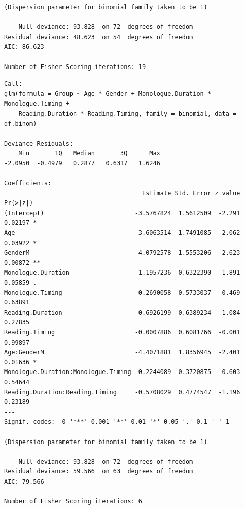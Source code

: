 \documentclass[
  english,
  doc,floatsintext]{apa6}
\begin{document}
\begin{verbatim}
(Dispersion parameter for binomial family taken to be 1)

    Null deviance: 93.828  on 72  degrees of freedom
Residual deviance: 48.623  on 54  degrees of freedom
AIC: 86.623

Number of Fisher Scoring iterations: 19
\end{verbatim}

\begin{verbatim}
Call:
glm(formula = Group ~ Age * Gender + Monologue.Duration * Monologue.Timing + 
    Reading.Duration * Reading.Timing, family = binomial, data = df.binom)

Deviance Residuals: 
    Min       1Q   Median       3Q      Max  
-2.0950  -0.4979   0.2877   0.6317   1.6246  

Coefficients:
                                      Estimate Std. Error z value Pr(>|z|)   
(Intercept)                         -3.5767824  1.5612509  -2.291  0.02197 * 
Age                                  3.6063514  1.7491085   2.062  0.03922 * 
GenderM                              4.0792578  1.5553206   2.623  0.00872 **
Monologue.Duration                  -1.1957236  0.6322390  -1.891  0.05859 . 
Monologue.Timing                     0.2690058  0.5733037   0.469  0.63891   
Reading.Duration                    -0.6926199  0.6389234  -1.084  0.27835   
Reading.Timing                      -0.0007886  0.6081766  -0.001  0.99897   
Age:GenderM                         -4.4071881  1.8356945  -2.401  0.01636 * 
Monologue.Duration:Monologue.Timing -0.2244089  0.3720875  -0.603  0.54644   
Reading.Duration:Reading.Timing     -0.5708029  0.4774547  -1.196  0.23189   
---
Signif. codes:  0 '***' 0.001 '**' 0.01 '*' 0.05 '.' 0.1 ' ' 1

(Dispersion parameter for binomial family taken to be 1)

    Null deviance: 93.828  on 72  degrees of freedom
Residual deviance: 59.566  on 63  degrees of freedom
AIC: 79.566

Number of Fisher Scoring iterations: 6
\end{verbatim}
\end{document}
